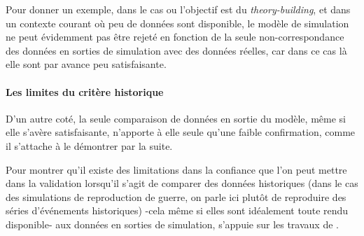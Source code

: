 
Pour donner un exemple, dans le cas ou l'objectif est du \textit{theory-building}, et dans un contexte courant où peu de données sont disponible, le modèle de simulation ne peut évidemment pas être rejeté en fonction de la seule non-correspondance des données en sorties de simulation avec des données réelles, car dans ce cas là elle sont par avance peu satisfaisante. 

\paragraph{Les limites du critère historique}

D'un autre coté, la seule comparaison de données en sortie du modèle, même si elle s'avère satisfaisante, n'apporte à elle seule qu'une faible confirmation, comme il s'attache à le démontrer par la suite. 

Pour montrer qu'il existe des limitations dans la confiance que l'on peut mettre dans la validation lorsqu'il s'agit de comparer des données historiques (dans le cas des simulations de reproduction de guerre, on parle ici plutôt de reproduire des séries d'événements historiques) -cela même si elles sont idéalement toute rendu disponible- aux données en sorties de simulation, \textcite{Hermann1967b} s'appuie sur les travaux de \textcite{Pool1965}.

